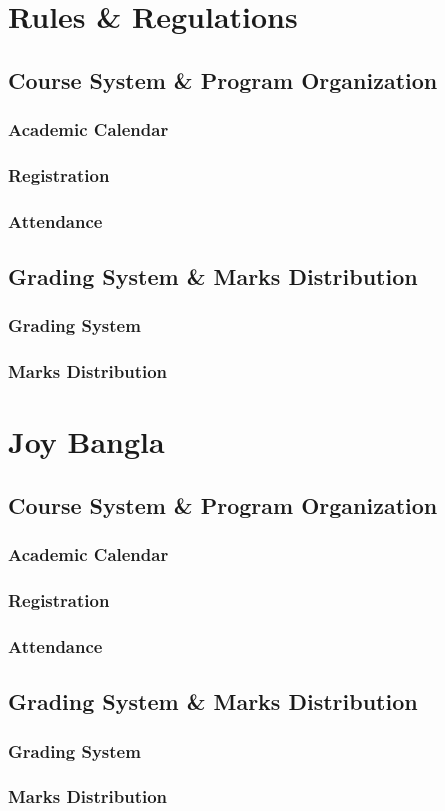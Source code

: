 \documentclass[11pt]{article}
\begin{document}
\vspace{1cm}

\section{Rules \& Regulations}
    \subsection{Course System \& Program Organization}
        \subsubsection{Academic Calendar}
        \subsubsection{Registration}
        \subsubsection{Attendance}
    \subsection{Grading System \& Marks Distribution}
        \subsubsection{Grading System}
        \subsubsection{Marks Distribution}
\section{Joy Bangla}
    \subsection{Course System \& Program Organization}
        \subsubsection{Academic Calendar}
        \subsubsection{Registration}
        \subsubsection{Attendance}
    \subsection{Grading System \& Marks Distribution}
        \subsubsection{Grading System}
        \subsubsection{Marks Distribution}        
\end{document}
